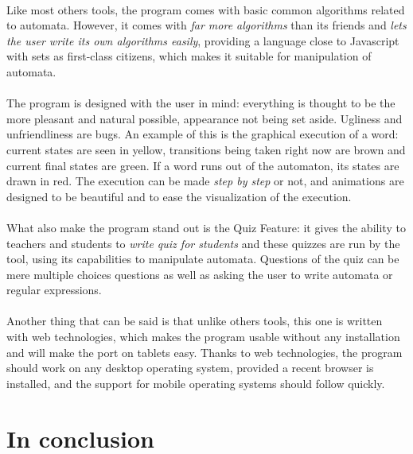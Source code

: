 \documentclass{article}
\begin{document}
\begin{sloppypar}
   
\paragraph{}
Like most others tools, the program comes with basic common algorithms related to automata. However, it comes with {\em far more algorithms} than its friends and {\em lets the user write its own algorithms easily}, providing a language close to Javascript with sets as first-class citizens, which makes it suitable for manipulation of automata.

   
\paragraph{}
The program is designed with the user in mind: everything is thought to be the more pleasant and natural possible, appearance not being set aside. Ugliness and unfriendliness are bugs. An example of this is the graphical execution of a word: current states are seen in yellow, transitions being taken right now are brown and current final states are green. If a word runs out of the automaton, its states are drawn in red. The execution can be made {\em step by step} or not, and animations are designed to be beautiful and to ease the visualization of the execution.

   
\paragraph{}
What also make the program stand out is the Quiz Feature: it gives the ability to teachers and students to {\em write quiz for students} and these quizzes are run by the tool, using its capabilities to manipulate automata. Questions of the quiz can be mere multiple choices questions as well as asking the user to write automata or regular expressions.
   
   
\paragraph{}
Another thing that can be said is that unlike others tools, this one is written with web technologies, which makes the program usable without any installation and will make the port on tablets easy. Thanks to web technologies, the program should work on any desktop operating system, provided a recent browser is installed, and the support for mobile operating systems should follow quickly.




\section*{ In conclusion}



\end{sloppypar}
\end{document}
